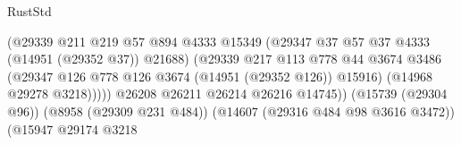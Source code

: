 \begin{lexlean}{RustStd}
\begin{coremodule}
                                                        (@29339
                                                          @211
                                                          @219
                                                          @57
                                                          @894
                                                          @4333
                                                          @15349
                                                          (@29347
                                                            @37
                                                            @57
                                                            @37
                                                            @4333
                                                            (@14951 (@29352 @37))
                                                            @21688)
                                                          (@29339
                                                            @217
                                                            @113
                                                            @778
                                                            @44
                                                            @3674
                                                            @3486
                                                            (@29347
                                                              @126
                                                              @778
                                                              @126
                                                              @3674
                                                              (@14951 (@29352 @126))
                                                              @15916)
                                                            (@14968 @29278 @3218)))))
                                                    @26208
                                                    @26211
                                                    @26214
                                                    @26216
                                                    @14745))
                                                (@15739 (@29304 @96))
                                                (@8958 (@29309 @231 @484))
                                                (@14607 (@29316 @484 @98 @3616 @3472))
                                                (@15947
                                                  @29174
                                                  @3218

\end{coremodule}
\end{lexlean}

